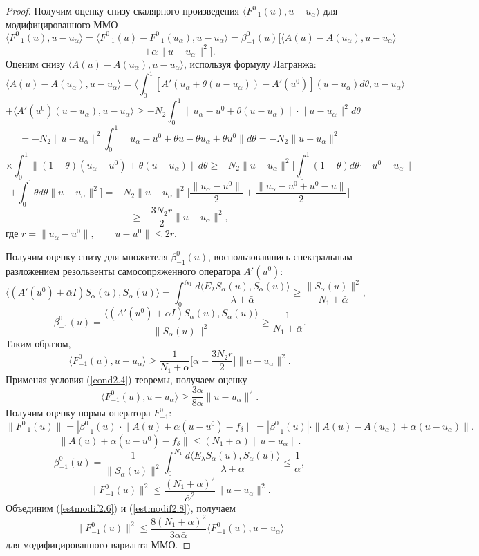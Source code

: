 \begin{proof} Получим оценку снизу скалярного произведения $\langle F_{-1}^0(u),u-u_\alpha\rangle$ для модифицированного ММО
$$\langle F_{-1}^0(u),u-u_\alpha\rangle=\langle F_{-1}^0(u)-F_{-1}^0(u_\alpha),u-u_\alpha\rangle=\beta_{-1}^0(u)[\langle A(u)-A(u_\alpha),u-u_\alpha\rangle$$ $$+\alpha\|u-u_\alpha\|^2].$$
Оценим снизу $\langle A(u)-A(u_\alpha),u-u_\alpha\rangle$, используя формулу Лагранжа: $$\langle A(u)-A(u_\alpha),u-u_\alpha\rangle=\langle\int_{0}^{1}[A'(u_\alpha+\theta(u-u_\alpha))-A'(u^0)](u-u_\alpha)d\theta, u-u_\alpha\rangle$$ $$+\langle A'(u^0)(u-u_\alpha), u-u_\alpha\rangle\ge-N_2\int_{0}^{1}\|u_\alpha-u^0+\theta(u-u_\alpha)\|\cdot\|u-u_\alpha\|^2d\theta$$ $$=-N_2\|u-u_\alpha\|^2\int_{0}^{1}\|u_\alpha-u^0+\theta u-\theta u_\alpha\pm\theta u^0\|d\theta=-N_2\|u-u_\alpha\|^2$$
$$\times\int_{0}^{1}\|(1-\theta)(u_\alpha-u^0)+\theta(u-u_\alpha)\|d\theta\ge-N_2\|u-u_\alpha\|^2\Big[\int_{0}^{1}(1-\theta)d\theta\cdot\|u^0-u_\alpha\|$$$$+\int_{0}^{1}\theta d\theta\|u-u_\alpha\|^2\Big]=-N_2\|u-u_\alpha\|^2\Big[\frac{\|u_\alpha-u^0\|}{2}+\frac{\|u_\alpha-u^0+u^0-u\|}{2}\Big]$$
\begin{equation}\label{estmodif2.5}
\ge-\frac{3N_2r}{2}\|u-u_\alpha\|^2,
\end{equation}
где $r=\|u_\alpha-u^0\|,\quad \|u-u^0\|\le 2r$.

Получим оценку снизу для множителя $\beta_{-1}^0(u)$, воспользовавшись спектральным разложением резольвенты самосопряженного оператора $A'(u^0)$:
$$\langle (A'(u^0)+\bar{\alpha}I)S_\alpha(u), S_\alpha(u)\rangle=\int_{0}^{N_1}\frac{d\langle E_\lambda S_\alpha(u), S_\alpha(u)\rangle}{\lambda+\bar{\alpha}}\ge\frac{\|S_\alpha(u)\|^2}{N_1+\bar{\alpha}},$$
$$\beta_{-1}^0(u)=\frac{\langle (A'(u^0)+\bar{\alpha}I)S_\alpha(u), S_\alpha(u)\rangle}{\|S_\alpha(u)\|^2}\ge\frac{1}{N_1+\bar{\alpha}}.$$ 
Таким образом, $$\langle F_{-1}^0(u),u-u_\alpha\rangle\ge\frac{1}{N_1+\bar{\alpha}}\Big[\alpha-\frac{3N_2r}{2}\Big]\|u-u_\alpha\|^2.$$
Применяя условия (\ref{cond2.4}) теоремы, получаем оценку
\begin{equation}\label{estmodif2.6}
\langle F_{-1}^0(u),u-u_\alpha\rangle\ge\frac{3\alpha}{8\bar{\alpha}}\|u-u_\alpha\|^2.
\end{equation}
Получим оценку нормы оператора $F_{-1}^0$:
$$\|F_{-1}^0(u)\|=|\beta_{-1}^0(u)|\cdot\|A(u)+\alpha(u-u^0)-f_\delta\|=|\beta_{-1}^0(u)|\cdot\|A(u)-A(u_\alpha)+\alpha(u-u_\alpha)\|.$$
\begin{equation}\label{estmodif2.7}
\|A(u)+\alpha(u-u^0)-f_\delta\|\le(N_1+\alpha)\|u-u_\alpha\|.
\end{equation}
$$\beta_{-1}^0(u)=\frac{1}{\|S_\alpha(u)\|^2}\int_{0}^{N_1}\frac{d\langle E_\lambda S_\alpha(u), S_\alpha(u)\rangle}{\lambda + \bar{\alpha}}\le\frac{1}{\bar{\alpha}},$$
\begin{equation}\label{estmodif2.8}
\|F_{-1}^0(u)\|^2\le\frac{(N_1+\alpha)^2}{\bar{\alpha}^2}\|u-u_\alpha\|^2.
\end{equation}
Объединим (\ref{estmodif2.6}) и (\ref{estmodif2.8}), получаем
$$\|F_{-1}^0(u)\|^2\le\frac{8(N_1+\alpha)^2}{3\alpha\bar{\alpha}}\langle F_{-1}^0(u), u-u_\alpha\rangle$$ для модифицированного варианта ММО.


\end{proof}

